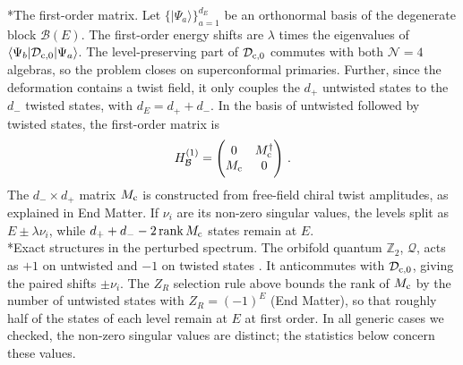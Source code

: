 \documentclass[aps,twocolumn,preprintnumbers,groupedaddress,nofootinbib,prl]{revtex4-2}
\makeatletter
\renewcommand\paragraph{\@startsection{paragraph}{4}{\parindent}{\z@}{-1em}{\normalfont\normalsize\bfseries}}
\newcommand{\Def}{\mathcal D}
\newcommand{\B}{\mathcal B}
\newcommand{\HB}{H_{\B}}
\newcommand{\cMat}{{\rm c}}
\newcommand{\lam}{\lambda}
\newcommand{\Mc}{M_{\cMat}}
\newcommand{\Dcz}{\Def_{\cMat,0}}
\DeclareMathOperator{\rank}{rank}
\makeatother
\begin{document}
\paragraph*{The first-order matrix.}
Let $\{|\Psi_a\rangle\}_{a=1}^{d_E}$ be an orthonormal basis of the degenerate block $\B(E)$. The first-order energy shifts are $\lam$ times the eigenvalues of $\langle\Psi_b|\Dcz|\Psi_a\rangle$. The level-preserving part of $\Dcz$ commutes with both $\mathcal N=4$ algebras, so the problem closes on superconformal primaries. Further, since the deformation contains a twist field, it only couples the $d_+$ untwisted states to the $d_-$ twisted states, with $d_E=d_++d_-$. In the basis of untwisted followed by twisted states, the first-order matrix is
\begin{equation}
\label{eq:Mc}
\HB^{(1)}=\begin{pmatrix}0&\Mc^{\dagger}\\ \Mc&0\end{pmatrix}\,.
\end{equation}
The $d_-\times d_+$ matrix $\Mc$ is constructed from free-field chiral twist amplitudes, as explained in End Matter. If $\nu_i$ are its non-zero singular values, the levels split as $E\pm\lam\nu_i$, while $d_++d_--2\rank\Mc$ states remain at $E$.\\

\paragraph*{Exact structures in the perturbed spectrum.}
The orbifold quantum $\mathbb Z_2$, $\mathcal Q$, acts as $+1$ on untwisted and $-1$ on twisted states \cite{Gaberdiel:2013psa}. It anticommutes with $\Dcz$, giving the paired shifts $\pm\nu_i$. The $Z_R$ selection rule above bounds the rank of $\Mc$ by the number of untwisted states with $Z_R=(-1)^E$ (End Matter), so that roughly half of the states of each level remain at $E$ at first order. In all generic cases we checked, the non-zero singular values are distinct; the statistics below concern these values.\\
\end{document}

